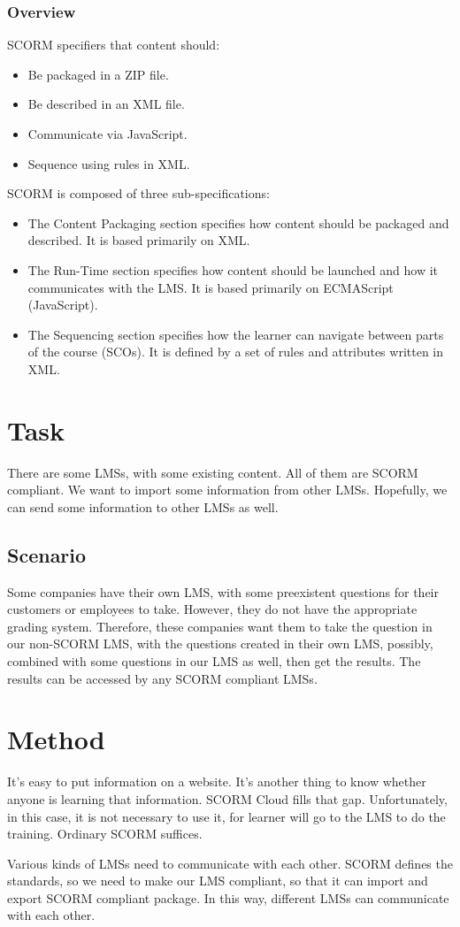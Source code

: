 \documentclass[11pt]{report}
\begin{document}
\subsubsection{Overview}
SCORM specifiers that content should:
\begin{itemize}
	\item
		Be packaged in a ZIP file.
	\item
		Be described in an XML file.
	\item
		Communicate via JavaScript.
	\item
		Sequence using rules in XML.
\end{itemize}
SCORM is composed of three sub-specifications:
\begin{itemize}
	\item
		The Content Packaging section specifies how content should be packaged and described. It is based primarily on XML.
	\item
		The Run-Time section specifies how content should be launched and how it communicates with the LMS. It is based primarily on ECMAScript 
		(JavaScript).
	\item
		The Sequencing section specifies how the learner can navigate between parts of the course (SCOs). It is defined by a set of rules and 
		attributes written in XML.
\end{itemize}


\section{Task}
There are some LMSs, with some existing content. All of them are SCORM compliant. We want to import some information from other LMSs. Hopefully, we 
can send some information to other LMSs as well.
\subsection{Scenario}
Some companies have their own LMS, with some preexistent questions for their customers or employees to take. However, they do not have the appropriate 
grading system. Therefore, these companies want them to take the question in our non-SCORM LMS, with the questions created in their own LMS, possibly, 
combined with some questions in our LMS as well, then get the results. The results can be accessed by any SCORM compliant LMSs.
\section{Method}
It’s easy to put information on a website. It’s another thing to know whether anyone is learning that information. SCORM Cloud fills that gap. 
Unfortunately, in this case, it is not necessary to use it, for learner will go to the LMS to do the training. Ordinary SCORM suffices.

Various kinds of LMSs need to communicate with each other. SCORM defines the standards, so we need to make our LMS compliant, so that it can import 
and export SCORM compliant package. In this way, different LMSs can communicate with each other.
\end{document}
